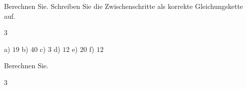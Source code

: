\documentclass[11pt]{exam}
\begin{document}
\begin{questions}

\question Berechnen Sie. Schreiben Sie die Zwischenschritte als korrekte
Gleichungskette auf.
\begin{multicols}{3}
\end{multicols}
\begin{solution}
  a) $19$ \quad b) $40$ \quad c) $3$ \quad d) $12$ \quad e) $20$ \quad f) $12$
\end{solution}
\raum{3.5cm}

\question Berechnen Sie.
\begin{multicols}{3}
\end{multicols}
\end{questions}
\end{document}
